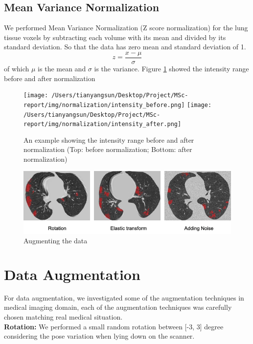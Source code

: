 \subsection{Mean Variance Normalization}
We performed Mean Variance Normalization (Z score normalization) for the lung tissue voxels by subtracting each volume with its mean and divided by its standard deviation. So that the data has zero mean and standard deviation of 1. 
$$z=\frac{x-\mu}{\sigma}$$ of which $\mu$ is the mean and $\sigma$ is the variance. Figure \ref{fig:normalization} showed the intensity range before and after normalization

\begin{figure}[h]
	\centering
	\texttt{[image: /Users/tianyangsun/Desktop/Project/MSc-report/img/normalization/intensity\_before.png]}
	\texttt{[image: /Users/tianyangsun/Desktop/Project/MSc-report/img/normalization/intensity\_after.png]}
	\caption{An example showing the intensity range before and after normalization (Top: before normalization; Bottom: after normalization)}
	\label{fig:normalization}
\end{figure}

\begin{figure}[h]
	\centering
	\includegraphics[width=\textwidth]{img/augment/rot_el_noise}
	\caption{Augmenting the data}
\end{figure}
\section{Data Augmentation}
For data augmentation, we investigated some of the augmentation techniques in medical imaging domain, each of the augmentation techniques was carefully chosen matching real medical situation.\\

\textbf{Rotation:} We performed a small random rotation between [-3, 3] degree considering the pose variation when lying down on the scanner.\\

